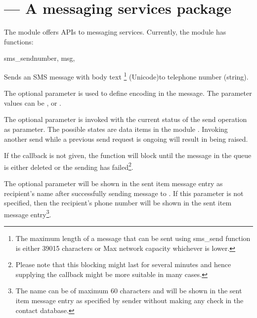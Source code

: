 %
%
%

\section{ --- 
    A messaging services package}
\label{sec:messaging}


The  module offers APIs to messaging services. Currently, 
the  module has functions:

\begin{funcdesc}{sms_send}{number, msg, }

Sends an SMS message with body text \footnote{The maximum length of a 
message that can be sent using sms_send function is either 39015 characters or Max network 
capacity whichever is lower.} (Unicode)to telephone number  (string). 

The optional parameter  is used to define encoding in the message. 
The parameter values can be ,  or .

The optional parameter  is invoked with the current status of the 
send operation as parameter. The possible states are data items in the module 
. Invoking another send while a previous send request is ongoing 
will result in  being raised.

If the callback is not given, the  function will block until the 
message in the queue is either deleted or the sending has failed\footnote{Please 
note that this blocking might last for several minutes and hence supplying the 
callback might be more suitable in many cases.}.

The optional parameter  will be shown in the sent item message entry as 
recipient's name after successfully sending message to . If this parameter 
is not specified, then the recipient's phone number will be shown in the sent item 
message entry\footnote{The name can be of maximum 60 characters and 
will be shown in the sent item message entry as specified by sender without 
making any check in the contact database.}.

\end{funcdesc}

